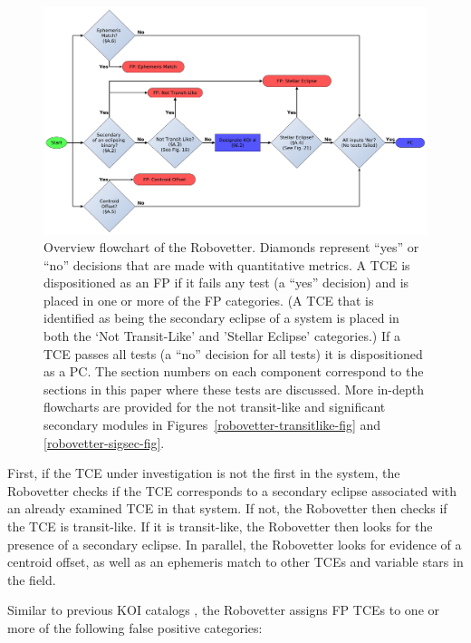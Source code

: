 \begin{figure}[htb]
\centering
\includegraphics[width=\linewidth]{RoboVetter-Diagram-V4-Overview.pdf}
\caption{Overview flowchart of the Robovetter. Diamonds represent ``yes'' or ``no'' decisions that are made with quantitative metrics. A TCE is dispositioned as an FP if it fails any test (a ``yes'' decision) and is placed in one or more of the FP categories. (A TCE that is identified as being the secondary eclipse of a system is placed in both the `Not Transit-Like' and 'Stellar Eclipse' categories.) If a TCE passes all tests (a ``no'' decision for all tests) it is dispositioned as a PC. The section numbers on each component correspond to the sections in this paper where these tests are discussed. More in-depth flowcharts are provided for the not transit-like and significant secondary modules in Figures~\ref{robovetter-transitlike-fig} and \ref{robovetter-sigsec-fig}.}
\label{robovetter-overview-fig}
\end{figure}


First, if the TCE under investigation is not the first in the system, the Robovetter checks if the TCE corresponds to a secondary eclipse associated with an already examined TCE in that system. If not, the Robovetter then checks if the TCE is transit-like. If it is transit-like, the Robovetter then looks for the presence of a secondary eclipse. In parallel, the Robovetter looks for evidence of a centroid offset, as well as an ephemeris match to other TCEs and variable stars in the \kepler{} field. 

\label{s:majorflags}
Similar to previous KOI catalogs \citep{Coughlin2016, Mullally2015cat, Rowe2015cat}, the Robovetter assigns FP TCEs to one or more of the following false positive categories:


